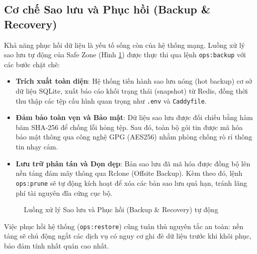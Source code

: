 \subsection{Cơ chế Sao lưu và Phục hồi (Backup \& Recovery)}
Khả năng phục hồi dữ liệu là yếu tố sống còn của hệ thống mạng. Luồng xử lý sao lưu tự động của Safe Zone (Hình \ref{fig:backup_recovery_flow}) được thực thi qua lệnh \texttt{ops:backup} với các bước chặt chẽ:
\begin{itemize}
    \item \textbf{Trích xuất toàn diện}: Hệ thống tiến hành sao lưu nóng (hot backup) cơ sở dữ liệu SQLite, xuất báo cáo khối trạng thái (snapshot) từ Redis, đồng thời thu thập các tệp cấu hình quan trọng như \texttt{.env} và \texttt{Caddyfile}.
    \item \textbf{Đảm bảo toàn vẹn và Bảo mật}: Dữ liệu sao lưu được đối chiếu bằng hàm băm SHA-256 để chống lỗi hỏng tệp. Sau đó, toàn bộ gói tin được mã hóa bảo mật thông qua công nghệ GPG (AES256) nhằm phòng chống rò rỉ thông tin nhạy cảm.
    \item \textbf{Lưu trữ phân tán và Dọn dẹp}: Bản sao lưu đã mã hóa được đồng bộ lên nền tảng đám mây thông qua Rclone (Offsite Backup). Kèm theo đó, lệnh \texttt{ops:prune} sẽ tự động kích hoạt để xóa các bản sao lưu quá hạn, tránh lãng phí tài nguyên đĩa cứng cục bộ.
\end{itemize}

\begin{figure}[H]
    \centering
    
    \caption{Luồng xử lý Sao lưu và Phục hồi (Backup \& Recovery) tự động}
    \label{fig:backup_recovery_flow}
\end{figure}

Việc phục hồi hệ thống (\texttt{ops:restore}) cũng tuân thủ nguyên tắc an toàn: nền tảng sẽ chủ động ngắt các dịch vụ có nguy cơ ghi đè dữ liệu trước khi khôi phục, bảo đảm tính nhất quán cao nhất.

